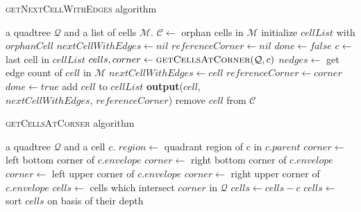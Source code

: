 {\ssp
\begin{algorithm}\caption{\textsc{getNextCellWithEdges} algorithm}\label{alg:one}
    \begin{algorithmic}[1]
    \Require a quadtree $\mathcal Q$ and a list of cells $\mathcal M$.
        \State $\mathcal C \gets $ orphan cells in $\mathcal M$
            \State initialize $cellList$ with $orphanCell$ 
            \State $nextCellWithEdges \gets nil$
            \State $referenceCorner \gets nil$
            \State $done \gets false$
                \State $c \gets $ last cell in $cellList$ 
                \State $cells, corner \gets \textsc{getCellsAtCorner}(\mathcal Q, c)$ 
                    \State $nedges \gets$ get edge count of $cell$ in $\mathcal M$ 
                        \State $nextCellWithEdges \gets cell$
                        \State $referenceCorner \gets corner$
                        \State $done \gets true$
                    \Else
                            \State add $cell$ to $cellList$
                        \EndIf
                    \EndIf
                \EndFor
            \EndWhile
                \State \textbf{output}($cell$, \\
                \hspace{2.5cm} $nextCellWithEdges$, $referenceCorner$)
                \State remove $cell$ from $\mathcal C$
            \EndFor
        \EndFor
    \EndFunction
    \end{algorithmic}
\end{algorithm}
}

{\ssp
\begin{algorithm} \caption{\textsc{getCellsAtCorner} algorithm}\label{alg:two}
    \begin{algorithmic}
    \Require a quadtree $\mathcal Q$ and a cell $c$.
        \State $region \gets $ quadrant region of c in $c.parent$
                \State $corner \gets$ left bottom corner of $c.envelope$
            \EndCase
                \State $corner \gets$ right bottom corner of $c.envelope$
            \EndCase
                \State $corner \gets$ left upper corner of $c.envelope$
            \EndCase
                \State $corner \gets$ right upper corner of $c.envelope$
            \EndCase
        \EndSwitch
        \State $cells \gets$ cells which intersect $corner$ in $\mathcal Q$
        \State $cells \gets cells - c$ 
        \State $cells \gets$ sort $cells$ on basis of their depth 
        \State {}
    \EndFunction
    \end{algorithmic}
\end{algorithm}
}

